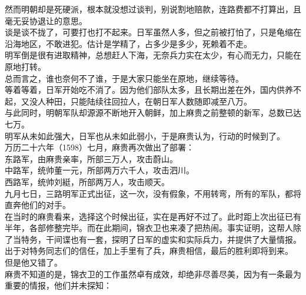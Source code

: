 \begin{multicols}{\theparacolNo}
然而明朝却是死硬派，根本就没想过谈判，别说割地赔款，连路费都不打算出，且毫无妥协退让的意思。\\

谈是谈不拢了，可要打也打不起来。日军虽然人多，但之前被打怕了，只是龟缩在沿海地区，不敢进犯。估计是学精了，占多少是多少，死赖着不走。\\

明军倒是很有进取精神，总想赶人下海，无奈兵力实在太少，有心而无力，只能在原地打转。\\

总而言之，谁也奈何不了谁，于是大家只能坐在原地，继续等待。\\

等着等着，日军开始吃不消了。因为他们部队太多，且长期出差在外，国内供养不起，又没人种田，只能陆续往回拉人，在朝日军人数随即减至八万。\\

与此同时，明朝军队却源源不断地开入朝鲜，加上麻贵之前整顿的新军，总数已达七万。\\

明军从未如此强大，日军也从未如此弱小，于是麻贵认为，行动的时候到了。\\

万历二十六年（1598）七月，麻贵再次做出了部署：\\

东路军，由麻贵亲率，所部三万人，攻击蔚山。\\

中路军，统帅董一元，所部两万六千人，攻击泗川。\\

西路军，统帅刘綎，所部两万人，攻击顺天。\\

九月七日，三路明军正式出征，这一次，没有假象，不用转弯，所有的军队，都将直奔他们的对手。\\

在当时的麻贵看来，选择这个时候出征，实在是再好不过了。此时距上次出征已有半年，各部修整完毕。而在此期间，锦衣卫也来凑了把热闹。事实证明，这帮人除了当特务，干间谍也有一套，探明了日军的虚实和实际兵力，并提供了大量情报。\\

出于对特务同志们的信任，加上手里有了兵，麻贵相信，最后的胜利即将到来。\\

但是他又错了。\\

麻贵不知道的是，锦衣卫的工作虽然卓有成效，却绝非尽善尽美，因为有一条最为重要的情报，他们并未探知：\\


\end{multicols}
